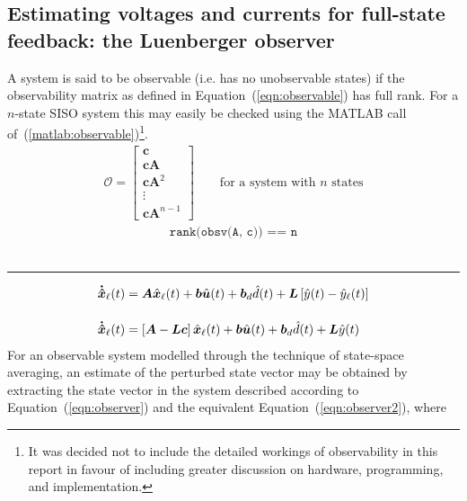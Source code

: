 \subsection{Estimating voltages and currents for full-state feedback: the Luenberger observer}
A system is said to be observable (i.e. has no unobservable states) if the observability matrix as defined in Equation~(\ref{eqn:observable}) has full rank. For a $n$-state SISO system this may easily be checked using the \textsf{MATLAB} call of~(\ref{matlab:observable})\footnote{It was decided not to include the detailed workings of observability in this report in favour of including greater discussion on hardware, programming, and implementation.}.
\begin{align}
\mathcal{O}
=
\begin{bmatrix}
\boldsymbol{c} \\
\boldsymbol{c}\boldsymbol{A} \\
\boldsymbol{c}\boldsymbol{A}^2 \\
\vdots \\
\boldsymbol{c}\boldsymbol{A}^{n - 1}
\end{bmatrix}
\qquad
\text{for a system with } n \text{ states}
\label{eqn:observable}
\end{align}
%
\begin{align}
\texttt{rank(obsv(A, c)) == n}
\label{matlab:observable}
\end{align}
~\rule{\textwidth}{0.5pt}
\begin{align}
\boldsymbol{\dot{\hat{x}}}_\ell (t) &= \boldsymbol{A}\hat{\boldsymbol{x}}_\ell(t) + \boldsymbol{b}\hat{\boldsymbol{u}}(t) + \boldsymbol{b}_d \hat{d}(t) + \boldsymbol{L}\left[\hat{y}(t) - \hat{y}_\ell(t)\right]
\label{eqn:observer}
\\[11pt]
\boldsymbol{\dot{\hat{x}}}_\ell (t) &= \left[\boldsymbol{A} - \boldsymbol{L}\boldsymbol{c}\right]\hat{\boldsymbol{x}}_\ell(t) + \boldsymbol{b}\hat{\boldsymbol{u}}(t) + \boldsymbol{b}_d \hat{d}(t) + \boldsymbol{L}\hat{y}(t)
\label{eqn:observer2}
\end{align}
For an observable system modelled through the technique of state-space averaging, an estimate of the perturbed state vector may be obtained by extracting the state vector in the system described according to Equation~(\ref{eqn:observer}) and the equivalent Equation~(\ref{eqn:observer2}), where
